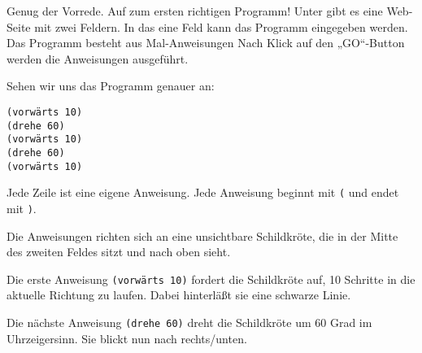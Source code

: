 \documentclass[a5paper,ngerman,9pt]{article}
\begin{document}
\begin{multicols}{2}
	Genug der Vorrede.
	Auf zum ersten richtigen Programm!
	Unter  gibt es eine Web-Seite mit zwei Feldern.
	In das eine Feld kann das Programm eingegeben werden.
	Das Programm besteht aus Mal-Anweisungen
	Nach Klick auf den „GO“-Button werden die Anweisungen ausgeführt.

	Sehen wir uns das Programm genauer an:

	\begin{Verbatim}
(vorwärts 10)
(drehe 60)
(vorwärts 10)
(drehe 60)
(vorwärts 10)
	\end{Verbatim}

	Jede Zeile ist eine eigene Anweisung.
	Jede Anweisung beginnt mit \verb|(| und endet mit
	\verb|)|.

	Die Anweisungen richten sich an eine unsichtbare Schildkröte, die
	in der Mitte des zweiten Feldes sitzt und nach oben sieht.

	Die erste Anweisung \verb|(vorwärts 10)| fordert die Schildkröte auf,
	10 Schritte in die aktuelle Richtung zu laufen.
	Dabei hinterläßt sie eine schwarze Linie.

	Die nächste Anweisung \verb|(drehe 60)| dreht die Schildkröte um
	$60$ Grad im Uhrzeigersinn. Sie blickt nun nach rechts/unten.
\end{multicols}
\end{document}
